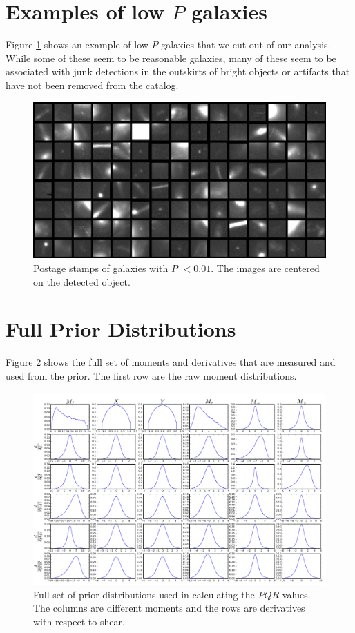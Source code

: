 \documentclass[useAMS,usenatbib]{mnras}
\begin{document}



\newpage
\appendix

\section{Examples of low $P$ galaxies}
Figure \ref{fig:outliers} shows an example of low $P$ galaxies that we cut out of our analysis.  While some of these seem to be reasonable galaxies, many of these seem to be associated with junk detections in the outskirts of bright objects or artifacts that have not been removed from the catalog.
\begin{figure}
    \includegraphics[width=\textwidth]{bad_examples.png}
    \caption{
    Postage stamps of galaxies with $P$ $< 0.01$.  The images are centered on the detected object.
    }
    \label{fig:outliers}
\end{figure}





\section{Full Prior Distributions}
Figure \ref{fig:full_prior} shows the full set of moments and derivatives that are measured and used from the prior.  The first row are the raw moment distributions.
\begin{figure}
    \includegraphics[width=\textwidth]{full_prior.png}
    \caption{
       Full set of prior distributions used in calculating the $PQR$ values.  The columns are different moments and the rows are derivatives with respect to shear.
    }
    \label{fig:full_prior}
\end{figure}
\end{document}
